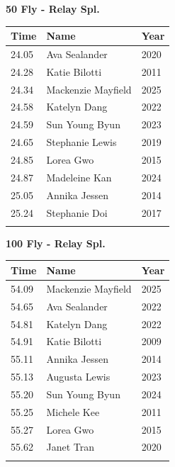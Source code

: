 \vspace{1.2em}
\noindent\begin{minipage}[t]{0.48\textwidth}
\centering
\textbf{\textcolor{teamprimary}{50 Fly - Relay Spl.}}\par
\vspace{0.5em}
\centering
\small
\renewcommand{\arraystretch}{1.0}
\setlength{\tabcolsep}{4pt}
\begin{tabular}{@{}p{1.8cm}p{3.0cm}p{1.0cm}@{}}
\toprule
\textbf{Time} & \textbf{Name} & \textbf{Year} \\
\midrule
24.05 & Ava Sealander & 2020 \\
24.28 & Katie Bilotti & 2011 \\
24.34 & Mackenzie Mayfield & 2025 \\
24.58 & Katelyn Dang & 2022 \\
24.59 & Sun Young Byun & 2023 \\
24.65 & Stephanie Lewis & 2019 \\
24.85 & Lorea Gwo & 2015 \\
24.87 & Madeleine Kan & 2024 \\
25.05 & Annika Jessen & 2014 \\
25.24 & Stephanie Doi & 2017 \\
\bottomrule
\vspace{0.5em}
\end{tabular}
\end{minipage}
\hfill
\begin{minipage}[t]{0.48\textwidth}
\centering
\textbf{\textcolor{teamprimary}{100 Fly - Relay Spl.}}\par
\vspace{0.5em}
\centering
\small
\renewcommand{\arraystretch}{1.0}
\setlength{\tabcolsep}{4pt}
\begin{tabular}{@{}p{1.8cm}p{3.0cm}p{1.0cm}@{}}
\toprule
\textbf{Time} & \textbf{Name} & \textbf{Year} \\
\midrule
54.09 & Mackenzie Mayfield & 2025 \\
54.65 & Ava Sealander & 2022 \\
54.81 & Katelyn Dang & 2022 \\
54.91 & Katie Bilotti & 2009 \\
55.11 & Annika Jessen & 2014 \\
55.13 & Augusta Lewis & 2023 \\
55.20 & Sun Young Byun & 2024 \\
55.25 & Michele Kee & 2011 \\
55.27 & Lorea Gwo & 2015 \\
55.62 & Janet Tran & 2020 \\
\bottomrule
\vspace{0.5em}
\end{tabular}
\end{minipage}
